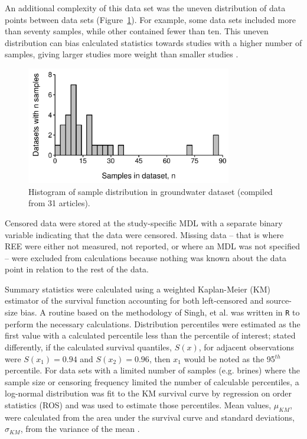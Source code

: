 An additional complexity of this data set was the uneven distribution of data points between data sets (Figure~\ref{fig:sample_dist}).
For example, some data sets included more than seventy samples, while other contained fewer than ten.
This uneven distribution can bias calculated statistics towards studies with a higher number of samples, giving larger studies more weight than smaller studies \citep{Singh_JAWMA_2013}.

\begin{figure}[htbp]
\begin{center}
\includegraphics[width=0.8\textwidth]{Ch3_figures/cite-n-dist.pdf}
\caption{Histogram of sample distribution in groundwater dataset (compiled from 31 articles).}\label{fig:sample_dist}
\end{center}
\end{figure}

Censored data were stored at the study-specific MDL with a separate binary variable indicating that the data were censored. Missing data -- that is where REE were either not measured, not reported, or where an MDL was not specified -- were excluded from calculations because nothing was known about the data point in relation to the rest of the data.

Summary statistics were calculated using a weighted Kaplan-Meier (KM) estimator of the survival function accounting for both left-censored and source-size bias.
A routine based on the methodology of Singh, et al. \citep{Singh_JAWMA_2013} was written in \texttt{R} \citep{R} to perform the necessary calculations.
Distribution percentiles were estimated as the first value with a calculated percentile less than the percentile of interest;
stated differently, if the calculated survival quantiles, $S(x)$, for adjacent observations were $S(x_1)=0.94$ and $S(x_2)=0.96$, then $x_1$ would be noted as the 95$^{th}$ percentile.
For data sets with a limited number of samples (e.g. brines) where the sample size or censoring frequency limited the number of calculable percentiles, a log-normal distribution was fit to the KM survival curve by regression on order statistics (ROS) and was used to estimate those percentiles.
Mean values, $\mu_{KM}$, were calculated from the area under the survival curve and standard deviations, $\sigma_{KM}$, from the variance of the mean \citep{Helsel_book}.

